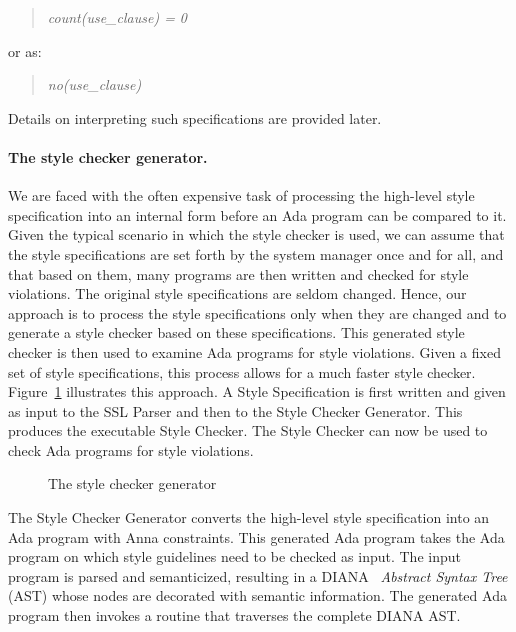 \begin{quote}\it
count(use\_clause) {\rm = 0}
\end{quote}

\noindent
or as:

\begin{quote}\it
no(use\_clause)
\end{quote}

Details on interpreting such specifications are provided later.

\paragraph{The style checker generator.}
We are faced with the often expensive task of processing the
high-level style specification into an internal form before an Ada
program can be compared to it.  Given the typical scenario in which
the style checker is used, we can assume that the style specifications
are set forth by the system manager once and for all, and that based
on them, many programs are then written and checked for style
violations.  The original style specifications are seldom changed.
Hence, our approach is to process the style specifications only when
they are changed and to generate a style checker based on these
specifications.  This generated style checker is then used to examine
Ada programs for style violations.  Given a fixed set of style
specifications, this process allows for a much faster style checker.
Figure~\ref{fig:black-box2} illustrates this approach.  A Style
Specification is first written and given as input to the SSL Parser and
then to the Style Checker Generator.  This produces the executable
Style Checker.  The Style Checker can now be used to check Ada programs
for style violations.

\begin{figure}[htbp]

\vspace{2in}


\caption{The style checker generator}
\label{fig:black-box2}

\end{figure}

The Style Checker Generator converts the high-level style specification
into an Ada program with Anna constraints.  This generated Ada program
takes the
Ada program on which style guidelines need to be checked as input.  The
input program is parsed and semanticized, resulting in a
DIANA~\cite{evans:diana-lrm} {\it Abstract Syntax Tree} (AST) whose
nodes are decorated with semantic information.  The generated Ada
program then invokes a routine that traverses the complete DIANA AST.

